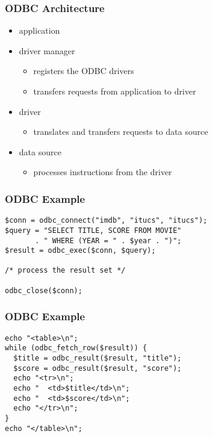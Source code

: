 \documentclass[dvipsnames]{beamer}
\theoremstyle{plain}
\begin{document}
\begin{frame}
  \frametitle{ODBC Architecture}

  \begin{itemize}
    \item application

    \pause
    \item driver manager
    \begin{itemize}
      \item registers the ODBC drivers
      \item transfers requests from application to driver
    \end{itemize}

    \pause
    \item driver
    \begin{itemize}
      \item translates and transfers requests to data source
    \end{itemize}

    \pause
    \item data source
    \begin{itemize}
      \item processes instructions from the driver
    \end{itemize}
  \end{itemize}
\end{frame}

\begin{frame}[fragile]
  \frametitle{ODBC Example}

  \begin{example}[PHP]
    \begin{lstlisting}[language=ExtendedPHP]
$conn = odbc_connect("imdb", "itucs", "itucs");
$query = "SELECT TITLE, SCORE FROM MOVIE"
       . " WHERE (YEAR = " . $year . ")";
$result = odbc_exec($conn, $query);

/* process the result set */

odbc_close($conn);
    \end{lstlisting}
  \end{example}
\end{frame}

\begin{frame}[fragile]
  \frametitle{ODBC Example}

  \begin{example}
    \begin{lstlisting}[language=ExtendedPHP]
echo "<table>\n";
while (odbc_fetch_row($result)) {
  $title = odbc_result($result, "title");
  $score = odbc_result($result, "score");
  echo "<tr>\n";
  echo "  <td>$title</td>\n";
  echo "  <td>$score</td>\n";
  echo "</tr>\n";
}
echo "</table>\n";
    \end{lstlisting}
  \end{example}
\end{frame}
\end{document}
